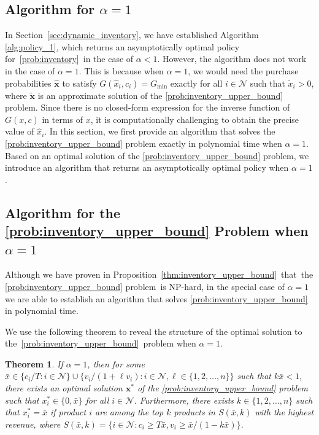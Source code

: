 \documentclass[mnsc,non-blindrev]{informs3}
\newtheorem{theorem}{Theorem}[section]
\theoremstyle{definition}
\begin{document}
\begin{appendices}{\Large{}}
\section{Algorithm for $\alpha=1$}\label{sec:policy_alpha=1}

In Section~\ref{sec:dynamic_inventory}, we have established Algorithm \ref{alg:policy_1}, which returns an asymptotically optimal policy for~\ref{prob:inventory}~in the case of $\alpha<1$. However, the algorithm does not work in the case of $\alpha=1$. This is because when $\alpha=1$, we would need the purchase probabilities $\hat{\bm{x}}$ to satisfy $G(\hat{x}_i,c_i)=G_{\min}$ exactly for all $i\in\mathcal{N}$ such that $\tilde{x}_i>0$, where $\tilde{\bm{x}}$ is an approximate solution of the \ref{prob:inventory_upper_bound} problem. Since there is no closed-form expression for the inverse function of $G(x,c)$ in terms of $x$, it is computationally challenging to obtain the precise value of $\hat{x}_i$. In this section, we first provide an algorithm that solves the \ref{prob:inventory_upper_bound} problem exactly in polynomial time when $\alpha=1$. Based on an optimal solution of the \ref{prob:inventory_upper_bound} problem, we introduce an algorithm that returns an asymptotically optimal policy when $\alpha=1$.

\subsection{Algorithm for the \ref{prob:inventory_upper_bound} Problem when $\alpha=1$}

Although we have proven in Proposition~\ref{thm:inventory_upper_bound}~that~the \ref{prob:inventory_upper_bound} problem~is NP-hard, in the special case of $\alpha=1$ we are able to establish an algorithm that solves \ref{prob:inventory_upper_bound} in polynomial time.

We use the following theorem to reveal the structure of the optimal solution to the~\ref{prob:inventory_upper_bound}~problem when $\alpha=1$.

\begin{theorem}\label{thm:inventory_alpha=1}
If $\alpha=1$, then for some $\bar{x}\in\{c_i/T:i\in\mathcal{N}\}\cup\{v_i/(1+\ell v_i):i\in\mathcal{N},\ell\in\{1,2,\dots,n\}\}$ such that $k\bar{x}<1$, there exists an optimal solution $\bm{x}^*$ of the \ref{prob:inventory_upper_bound} problem such that $x^*_i\in\{0,\bar{x}\}$ for all $i\in\mathcal{N}$. Furthermore, there exists $k\in\{1,2,\dots,n\}$ such that $x_i^*=\bar{x}$ if product $i$ are among the top $k$ products in $S(\bar{x},k)$ with the highest revenue, where \mbox{$S(\bar{x},k)=\{i\in\mathcal{N}:c_i\geq T\bar{x},v_i\geq \bar{x}/(1-k\bar{x})\}$}.
\end{theorem}


\end{appendices}
\end{document}
